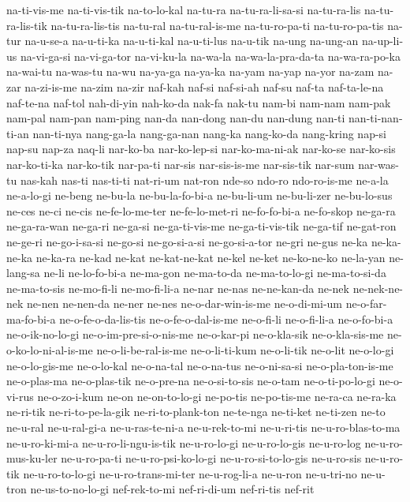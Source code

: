 {na-ti-vis-me na-ti-vis-tik na-to-lo-kal na-tu-ra na-tu-ra-li-sa-si
na-tu-ra-lis na-tu-ra-lis-tik na-tu-ra-lis-tis na-tu-ral na-tu-ral-is-me
na-tu-ro-pa-ti na-tu-ro-pa-tis na-tur na-u-se-a na-u-ti-ka na-u-ti-kal
na-u-ti-lus na-u-tik na-ung na-ung-an na-up-li-us na-vi-ga-si na-vi-ga-tor
na-vi-ku-la na-wa-la na-wa-la-pra-da-ta na-wa-ra-po-ka na-wai-tu na-was-tu
na-wu na-ya-ga na-ya-ka na-yam na-yap na-yor na-zam na-zar na-zi-is-me
na-zim na-zir naf-kah naf-si naf-si-ah naf-su naf-ta naf-ta-le-na
naf-te-na naf-tol nah-di-yin nah-ko-da nak-fa nak-tu nam-bi nam-nam
nam-pak nam-pal nam-pan nam-ping nan-da nan-dong nan-du nan-dung nan-ti
nan-ti-nan-ti-an nan-ti-nya nang-ga-la nang-ga-nan nang-ka nang-ko-da
nang-kring nap-si nap-su nap-za naq-li nar-ko-ba nar-ko-lep-si
nar-ko-ma-ni-ak nar-ko-se nar-ko-sis nar-ko-ti-ka nar-ko-tik nar-pa-ti
nar-sis nar-sis-is-me nar-sis-tik nar-sum nar-was-tu nas-kah nas-ti
nas-ti-ti nat-ri-um nat-ron nde-so ndo-ro ndo-ro-is-me ne-a-la ne-a-lo-gi
ne-beng ne-bu-la ne-bu-la-fo-bi-a ne-bu-li-um ne-bu-li-zer ne-bu-lo-sus
ne-ces ne-ci ne-cis ne-fe-lo-me-ter ne-fe-lo-met-ri ne-fo-fo-bi-a
ne-fo-skop ne-ga-ra ne-ga-ra-wan ne-ga-ri ne-ga-si ne-ga-ti-vis-me
ne-ga-ti-vis-tik ne-ga-tif ne-gat-ron ne-ge-ri ne-go-i-sa-si ne-go-si
ne-go-si-a-si ne-go-si-a-tor ne-gri ne-gus ne-ka ne-ka-ne-ka ne-ka-ra
ne-kad ne-kat ne-kat-ne-kat ne-kel ne-ket ne-ko-ne-ko ne-la-yan ne-lang-sa
ne-li ne-lo-fo-bi-a ne-ma-gon ne-ma-to-da ne-ma-to-lo-gi ne-ma-to-si-da
ne-ma-to-sis ne-mo-fi-li ne-mo-fi-li-a ne-nar ne-nas ne-ne-kan-da ne-nek
ne-nek-ne-nek ne-nen ne-nen-da ne-ner ne-nes ne-o-dar-win-is-me
ne-o-di-mi-um ne-o-far-ma-fo-bi-a ne-o-fe-o-da-lis-tis ne-o-fe-o-dal-is-me
ne-o-fi-li ne-o-fi-li-a ne-o-fo-bi-a ne-o-ik-no-lo-gi
ne-o-im-pre-si-o-nis-me ne-o-kar-pi ne-o-kla-sik ne-o-kla-sis-me
ne-o-ko-lo-ni-al-is-me ne-o-li-be-ral-is-me ne-o-li-ti-kum ne-o-li-tik
ne-o-lit ne-o-lo-gi ne-o-lo-gis-me ne-o-lo-kal ne-o-na-tal ne-o-na-tus
ne-o-ni-sa-si ne-o-pla-ton-is-me ne-o-plas-ma ne-o-plas-tik ne-o-pre-na
ne-o-si-to-sis ne-o-tam ne-o-ti-po-lo-gi ne-o-vi-rus ne-o-zo-i-kum ne-on
ne-on-to-lo-gi ne-po-tis ne-po-tis-me ne-ra-ca ne-ra-ka ne-ri-tik
ne-ri-to-pe-la-gik ne-ri-to-plank-ton ne-te-nga ne-ti-ket ne-ti-zen ne-to
ne-u-ral ne-u-ral-gi-a ne-u-ras-te-ni-a ne-u-rek-to-mi ne-u-ri-tis
ne-u-ro-blas-to-ma ne-u-ro-ki-mi-a ne-u-ro-li-ngu-is-tik ne-u-ro-lo-gi
ne-u-ro-lo-gis ne-u-ro-log ne-u-ro-mus-ku-ler ne-u-ro-pa-ti
ne-u-ro-psi-ko-lo-gi ne-u-ro-si-to-lo-gis ne-u-ro-sis ne-u-ro-tik
ne-u-ro-to-lo-gi ne-u-ro-trans-mi-ter ne-u-rog-li-a ne-u-ron ne-u-tri-no
ne-u-tron ne-us-to-no-lo-gi nef-rek-to-mi nef-ri-di-um nef-ri-tis nef-rit
}
